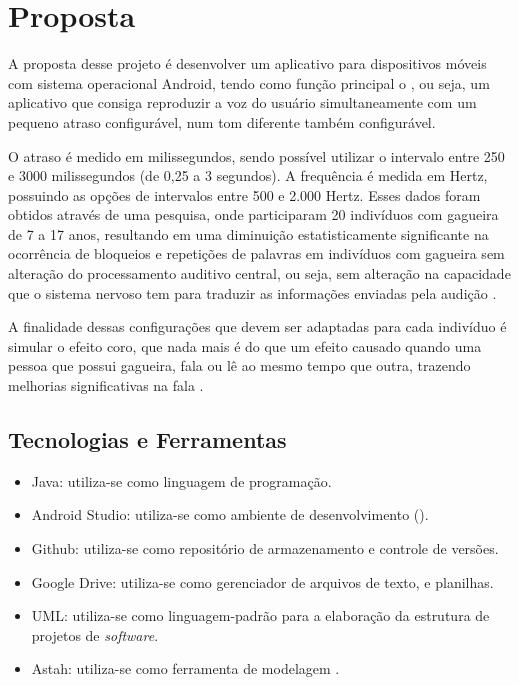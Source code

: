 \chapter{Proposta}

A proposta desse projeto \'e desenvolver um aplicativo para dispositivos m\'oveis com sistema operacional Android, tendo como fun\c{c}\~ao principal o , ou seja, um aplicativo que consiga reproduzir a voz do usu\'ario simultaneamente com um pequeno atraso configur\'avel, num tom diferente tamb\'em configur\'avel. 

O atraso \'e medido em milissegundos, sendo poss\'ivel utilizar o intervalo entre 250 e 3000 milissegundos (de 0,25 a 3 segundos). A frequ\^encia \'e medida em Hertz, possuindo as op\c{c}\~oes de intervalos entre 500 e 2.000 Hertz.  Esses dados foram obtidos atrav\'es de uma pesquisa, onde participaram 20 indiv\'iduos com gagueira de 7 a 17 anos, resultando em uma diminui\c{c}\~ao estatisticamente significante na ocorr\^encia de bloqueios e repeti\c{c}\~oes de palavras em indiv\'iduos com gagueira sem altera\c{c}\~ao do processamento auditivo central, ou seja, sem altera\c{c}\~ao na capacidade que o sistema nervoso tem para traduzir as informa\c{c}\~oes enviadas pela audi\c{c}\~ao \cite{PICOLOTO2017}.

A finalidade dessas configura\c{c}\~oes que devem ser adaptadas para cada indiv\'iduo \'e simular o efeito coro, que nada mais \'e do que um efeito causado quando uma pessoa que possui gagueira, fala ou l\^e ao mesmo tempo que outra, trazendo melhorias significativas na fala \cite{Udemo2008}.


\section{Tecnologias e Ferramentas}
\begin{itemize}
	
	\item Java: utiliza-se como linguagem de programa\c{c}\~ao.
	
	\item Android Studio: utiliza-se como ambiente de desenvolvimento 		().

	\item Github: utiliza-se como reposit\'orio de armazenamento e controle de vers\~oes.
	
	\item Google Drive: utiliza-se como gerenciador de arquivos de texto, e planilhas.

	\item UML: utiliza-se como linguagem-padr\~ao para a elabora\c{c}\~ao da estrutura de projetos de \textit{software}.

	\item Astah: utiliza-se como ferramenta de modelagem . 

\end{itemize}

